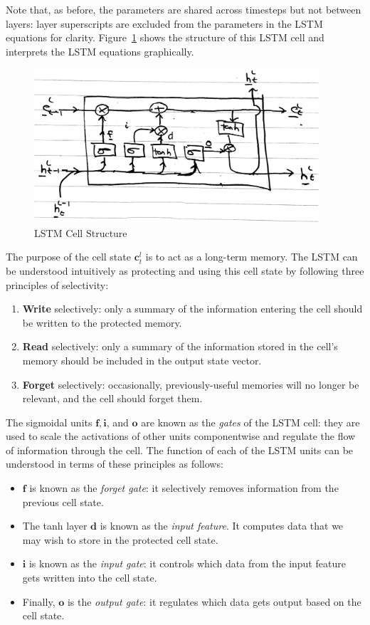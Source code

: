 \documentclass[12pt,a4paper,twoside,openright]{report}
\newcommand{\vect}[1]{\boldsymbol{\mathbf{#1}}}
\begin{document}
Note that, as before, the parameters are shared across timesteps but not between
layers: layer superscripts are excluded from the parameters in the LSTM
equations for clarity. Figure~\ref{fig:lstm-cell} shows the structure of this
LSTM cell and interprets the LSTM equations graphically.

\begin{figure}[H]
\centering
\includegraphics[width=300pt]{figs/lstm_detail_tmp.png}
\caption{LSTM Cell Structure}
\label{fig:lstm-cell}
\end{figure}

\vspace{-2mm}
The purpose of the cell state $\vect{c}_t^l$ is to act as a long-term memory.
The LSTM can be understood intuitively as protecting and using this cell state
by following three principles of selectivity:
\begin{enumerate}[label=\arabic*., itemsep=0mm]
  \item \textbf{Write} selectively: only a summary of the information entering
    the cell should be written to the protected memory.
  \item \textbf{Read} selectively: only a summary of the information stored in
    the cell's memory should be included in the output state vector.
  \item \textbf{Forget} selectively: occasionally, previously-useful memories
    will no longer be relevant, and the cell should forget them.
\end{enumerate}

The sigmoidal units $\vect{f}, \vect{i}$, and $\vect{o}$ are known as the
\emph{gates} of the LSTM cell: they are used to scale the activations of other
units componentwise and regulate the flow of information through the cell. The
function of each of the LSTM units can be understood in terms of these
principles as follows:

\begin{itemize}
  \item $\vect{f}$ is known as the \emph{forget gate}: it selectively removes
    information from the previous cell state.
  \item The tanh layer $\vect{d}$ is known as the \emph{input feature}. It
    computes data that we may wish to store in the protected cell state.
\item $\vect{i}$ is known as the \emph{input gate}: it controls which data from
  the input feature gets written into the cell state.
\item Finally, $\vect{o}$ is the \emph{output gate}: it regulates which data
  gets output based on the cell state.
\end{itemize}
\end{document}
